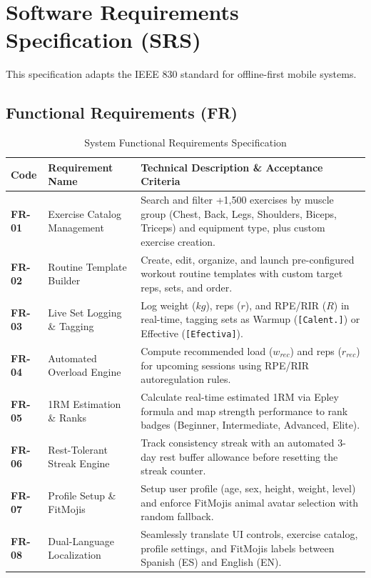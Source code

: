 \section{Software Requirements Specification (SRS)}

This specification adapts the IEEE 830 standard for offline-first mobile systems.

\subsection{Functional Requirements (FR)}

\begin{table}[h!]
\centering
\small
\caption{System Functional Requirements Specification}
\label{tab:functional_requirements}
\begin{tabularx}{\textwidth}{l p{4.2cm} X}
\toprule
\textbf{Code} & \textbf{Requirement Name} & \textbf{Technical Description \& Acceptance Criteria} \\
\midrule
\textbf{FR-01} & Exercise Catalog Management & Search and filter +1,500 exercises by muscle group (Chest, Back, Legs, Shoulders, Biceps, Triceps) and equipment type, plus custom exercise creation. \\
\textbf{FR-02} & Routine Template Builder & Create, edit, organize, and launch pre-configured workout routine templates with custom target reps, sets, and order. \\
\textbf{FR-03} & Live Set Logging \& Tagging & Log weight ($kg$), reps ($r$), and RPE/RIR ($R$) in real-time, tagging sets as Warmup (\texttt{[Calent.]}) or Effective (\texttt{[Efectiva]}). \\
\textbf{FR-04} & Automated Overload Engine & Compute recommended load ($w_{rec}$) and reps ($r_{rec}$) for upcoming sessions using RPE/RIR autoregulation rules. \\
\textbf{FR-05} & 1RM Estimation \& Ranks & Calculate real-time estimated 1RM via Epley formula and map strength performance to rank badges (Beginner, Intermediate, Advanced, Elite). \\
\textbf{FR-06} & Rest-Tolerant Streak Engine & Track consistency streak with an automated 3-day rest buffer allowance before resetting the streak counter. \\
\textbf{FR-07} & Profile Setup \& FitMojis & Setup user profile (age, sex, height, weight, level) and enforce FitMojis animal avatar selection with random fallback. \\
\textbf{FR-08} & Dual-Language Localization & Seamlessly translate UI controls, exercise catalog, profile settings, and FitMojis labels between Spanish (ES) and English (EN). \\

\end{tabularx}
\end{table}
